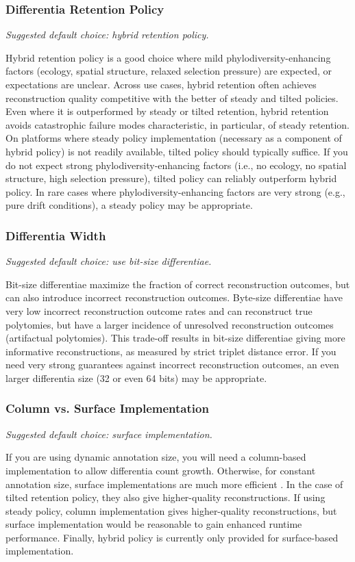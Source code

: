 \subsubsection{Differentia Retention Policy}
\textit{Suggested default choice: hybrid retention policy.}

Hybrid retention policy is a good choice where mild phylodiversity-enhancing factors (ecology, spatial structure, relaxed selection pressure) are expected, or expectations are unclear.
Across use cases, hybrid retention often achieves reconstruction quality competitive with the better of steady and tilted policies.
Even where it is outperformed by steady or tilted retention, hybrid retention avoids catastrophic failure modes characteristic, in particular, of steady retention.
On platforms where steady policy implementation (necessary as a component of hybrid policy) is not readily available, tilted policy should typically suffice.
If you do not expect strong phylodiversity-enhancing factors (i.e., no ecology, no spatial structure, high selection pressure), tilted policy can reliably outperform hybrid policy.
In rare cases where phylodiversity-enhancing factors are very strong (e.g., pure drift conditions), a steady policy may be appropriate.

\subsubsection{Differentia Width}
\textit{Suggested default choice: use bit-size differentiae.}

Bit-size differentiae maximize the fraction of correct reconstruction outcomes, but can also introduce incorrect reconstruction outcomes.
Byte-size differentiae have very low incorrect reconstruction outcome rates and can reconstruct true polytomies, but have a larger incidence of unresolved reconstruction outcomes (artifactual polytomies).
This trade-off results in bit-size differentiae giving more informative reconstructions, as measured by strict triplet distance error.
If you need very strong guarantees against incorrect reconstruction outcomes, an even larger differentia size (32 or even 64 bits) may be appropriate.

\subsubsection{Column vs. Surface Implementation}
\textit{Suggested default choice: surface implementation.}

If you are using dynamic annotation size, you will need a column-based implementation to allow differentia count growth.
Otherwise, for constant annotation size, surface implementations are much more efficient \citep{moreno2024trackable}.
In the case of tilted retention policy, they also give higher-quality reconstructions.
If using steady policy, column implementation gives higher-quality reconstructions, but surface implementation would be reasonable to gain enhanced runtime performance.
Finally, hybrid policy is currently only provided for surface-based implementation.

